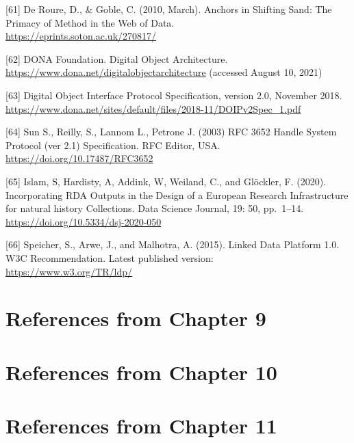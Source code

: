 {[}61{]} De Roure, D., \& Goble, C. (2010, March). Anchors in Shifting
Sand: The Primacy of Method in the Web of Data.\\
\url{https://eprints.soton.ac.uk/270817/}

{[}62{]} DONA Foundation. Digital Object Architecture.\\
\url{https://www.dona.net/digitalobjectarchitecture} (accessed August
10, 2021)

{[}63{]} Digital Object Interface Protocol Specification, version 2.0,
November 2018.\\
\url{https://www.dona.net/sites/default/files/2018-11/DOIPv2Spec_1.pdf}

{[}64{]} Sun S., Reilly, S., Lannom L., Petrone J. (2003) RFC 3652
Handle System Protocol (ver 2.1) Specification. RFC Editor, USA.\\
\url{https://doi.org/10.17487/RFC3652}

{[}65{]} Islam, S, Hardisty, A, Addink, W, Weiland, C., and Glöckler, F.
(2020). Incorporating RDA Outputs in the Design of a European Research
Infrastructure for natural history Collections. Data Science Journal,
19: 50, pp.~1--14.\\
\url{https://doi.org/10.5334/dsj-2020-050}

{[}66{]} Speicher, S., Arwe, J., and Malhotra, A. (2015). Linked Data
Platform 1.0. W3C Recommendation. Latest published version:\\
\url{https://www.w3.org/TR/ldp/}


\section{References from Chapter 9}

\section{References from Chapter 10}

\section{References from Chapter 11}


